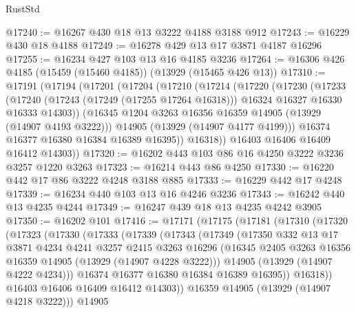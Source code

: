 \begin{lexlean}{RustStd}
\begin{coremodule}
@17240 := @16267 @430 @18 @13 @3222 @4188 @3188 @912
@17243 := @16229 @430 @18 @4188
@17249 := @16278 @429 @13 @17 @3871 @4187 @16296
@17255 := @16234 @427 @103 @13 @16 @4185 @3236
@17264 := @16306 @426 @4185 (@15459 (@15460 @4185)) (@13929 (@15465 @426 @13))
@17310 := @17191
    (@17194
      (@17201
        (@17204
          (@17210
            (@17214
              (@17220
                (@17230
                  (@17233
                    (@17240
                      (@17243 (@17249 (@17255 @17264 @16318)))
                      @16324
                      @16327
                      @16330
                      @16333
                      @14303))
                  (@16345 @1204 @3263 @16356 @16359 @14905 (@13929 (@14907 @4193 @3222)))
                  @14905
                  (@13929 (@14907 @4177 @4199)))
                @16374
                @16377
                @16380
                @16384
                @16389
                @16395))
            @16318))
        @16403
        @16406
        @16409
        @16412
        @14303))
@17320 := @16202 @443 @103 @86 @16 @4250 @3222 @3236 @3257 @1220 @3263
@17323 := @16214 @443 @86 @4250
@17330 := @16220 @442 @17 @86 @3222 @4248 @3188 @885
@17333 := @16229 @442 @17 @4248
@17339 := @16234 @440 @103 @13 @16 @4246 @3236
@17343 := @16242 @440 @13 @4235 @4244
@17349 := @16247 @439 @18 @13 @4235 @4242 @3905
@17350 := @16202 @101
@17416 := @17171
    (@17175
      (@17181
        (@17310
          (@17320
            (@17323
              (@17330
                (@17333
                  (@17339
                    (@17343
                      (@17349
                        (@17350
                          @332
                          @13
                          @17
                          @3871
                          @4234
                          @4241
                          @3257
                          @2415
                          @3263
                          @16296
                          (@16345 @2405 @3263 @16356 @16359 @14905 (@13929 (@14907 @4228 @3222)))
                          @14905
                          (@13929 (@14907 @4222 @4234)))
                        @16374
                        @16377
                        @16380
                        @16384
                        @16389
                        @16395))
                    @16318))
                @16403
                @16406
                @16409
                @16412
                @14303))
            @16359
            @14905
            (@13929 (@14907 @4218 @3222)))
          @14905

\end{coremodule}
\end{lexlean}
